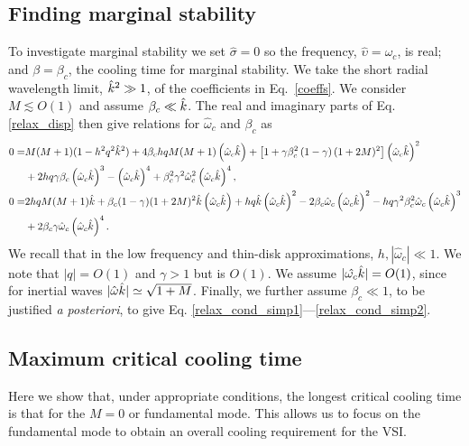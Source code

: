 \subsection{Finding marginal stability}\label{disp_neut_limit}
To investigate marginal stability we set $\hat{\sigma} = 0$ so the
frequency, $\hat{\upsilon}=\hat{\omega}_c$, is real; and $\beta =
\beta_c$,  the cooling time for marginal stability. 
We take the short radial wavelength limit, $\hat{k}^2\gg 1$, of the
coefficients in Eq.\ \ref{coeffs}. We consider $M \lesssim O(1)$ and
assume $\beta_c \ll \hat{k}$.  The real and 
imaginary parts of Eq. \ref{relax_disp} then give relations for $\hat{\omega}_c$ and $\beta_c$ as 
\begin{align}
  0 =&M(M+1)(1-h^2 q^2 \hat{k}^2) + 4\beta_c h q M(M+1)\left(\hat{\omega}_c\hat{k}\right) 
 +\left[1 +
    \gamma\beta_c^2\left(1-\gamma\right)(1+2M)^2\right]\left(\hat{\omega}_c\hat{k}\right)^2 \label{relax_cond1} \\
 &+ 2h q \gamma\beta_c \left(\hat{\omega}_c\hat{k}\right)^3 -  \left(\hat{\omega}_c\hat{k}\right)^4 
  + \beta_c^2\gamma^2\hat{\omega}_c^2
  \left(\hat{\omega}_c\hat{k}\right)^4, \notag \\
   0=& 2h q M (M+1)\hat{k} +
   \beta_c(1-\gamma)(1+2M)^2\hat{k}\left(\hat{\omega}_c\hat{k}\right) 
   + h q \hat{k} \left(\hat{\omega}_c\hat{k}\right)^2 -
   2\beta_c\hat{\omega}_c\left(\hat{\omega}_c\hat{k}\right)^2
   - h q
   \gamma^2\beta_c^2\hat{\omega}_c\left(\hat{\omega}_c\hat{k}\right)^3 \label{relax_cond2} \\
   &+
   2\beta_c\gamma\hat{\omega}_c\left(\hat{\omega}_c\hat{k}\right)^4 \notag. 
\end{align}
We recall that in the low frequency and thin-disk approximations, $h,
|\hat{\omega}_c| \ll 1$. We note that $|q|=O(1)$ and 
$\gamma>1$ but is $O(1)$. We assume $|\hat{\omega_c}\hat{k}|=O(1)$,
since for inertial waves $|\hat{\omega}\hat{k}|\simeq \sqrt{1 + M}$. Finally, we further assume 
$\beta_c \ll 1$, to be justified \emph{a posteriori}, to give 
Eq. \ref{relax_cond_simp1}---\ref{relax_cond_simp2}.   

\subsection{Maximum critical cooling time}\label{max_cool}   
Here we show that, under appropriate conditions, the longest critical 
cooling time is that for the $M=0$ or fundamental mode. This allows
us to focus on the fundamental mode to obtain an overall cooling
requirement for the VSI.      

